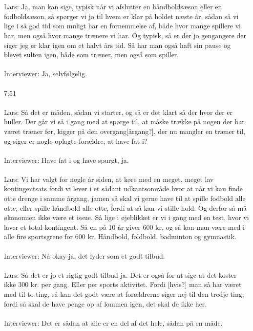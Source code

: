 \\\\
Lars: Ja, man kan sige, typisk når vi afslutter en håndboldsæson eller en fodboldsæson, så spørger vi jo til hvem er klar på holdet næste år, sådan så vi lige i så god tid som muligt har en fornemmelse af, både hvor mange spillere vi har, men også hvor mange trænere vi har. Og typisk, så er der jo gengangere der siger jeg er klar igen om et halvt års tid. Så har man også haft sin pause og blevet sulten igen, både som træner, men også som spiller.
\\\\
Interviewer: Ja, selvfølgelig.
\\\\
7:51
\\\\
Lars: Så det er måden, sådan vi starter, og så er det klart så der hvor der er huller. Der går vi så i gang med at spørge til, at måske  trække på nogen der har været træner før, kigger på den overgang[årgang?], der nu mangler en træner til, og siger er nogle oplagte forældre, at have fat i?
\\\\
Interviewer: Have fat i og have spurgt, ja.
\\\\
Lars: Vi har valgt for nogle år siden, at køre med en meget, meget lav kontingentsats fordi vi lever i et sådant udkantsområde hvor at når vi kan finde otte drenge i samme årgang, jamen så skal vi gerne have til at spille fodbold alle otte, eller spille håndbold alle otte, fordi at så kan vi stille hold. Og derfor så må økonomien ikke være et issue.
Så lige i øjeblikket er vi i gang med en test, hvor vi laver et total kontingent. Så en på 10 år giver 600 kr, og så kan man være med i alle fire sportsgrene for 600 kr. Håndbold, foldbold, badminton og gymnastik. 
\\\\
Interviewer: Nå okay ja, det lyder som et godt tilbud.
\\\\
Lars: Så det er jo et rigtig godt tilbud ja. Det er også for at sige at det koster ikke 300 kr. per gang. Eller per sports aktivitet. Fordi [hvis?] man så har været med til to ting, så kan det godt være at forældrerne siger nej til den tredje ting, fordi så skal de have penge op af lommen igen, det skal de ikke her. 
\\\\
Interviewer: Det er sådan at alle er en del af det hele, sådan på en måde. 

